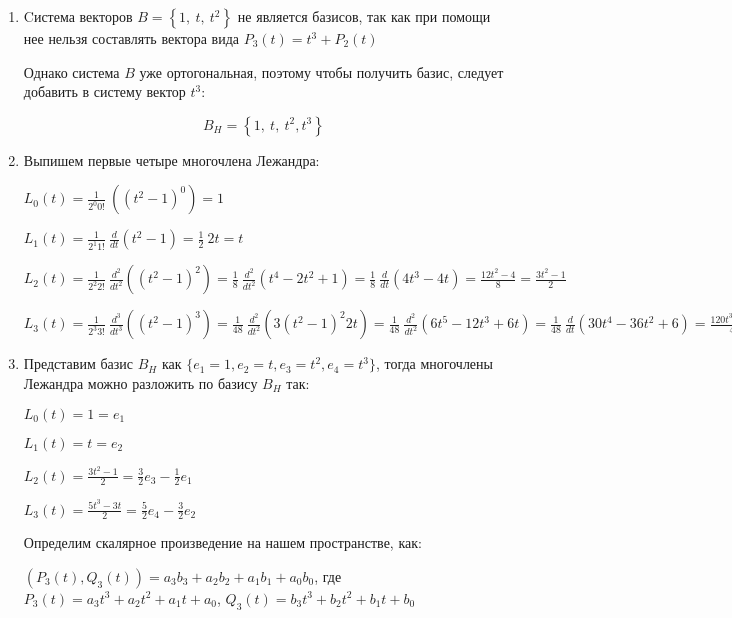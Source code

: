 \begin{enumerate}
    \item Cистема векторов $B=\left\{1,\ t,\ t^2\right\}$ не является базисов, так как при помощи нее нельзя составлять вектора вида $P_3(t) = t^3 + P_2(t)$

    Однако система $B$ уже ортогональная, поэтому чтобы получить базис, следует добавить в систему вектор $t^3$:

    \[B_H = \left\{1,\ t,\ t^2, t^3\right\}\]

    \item Выпишем первые четыре многочлена Лежандра:

    $\displaystyle L_0\left(t\right)=\frac{1}{2^0 0!}\ \left(\left(t^2-1\right)^0\right) = 1$

    $\displaystyle L_1\left(t\right)=\frac{1}{2^1 1!}\ \frac{d}{dt}\left(t^2-1\right) = \frac{1}{2}\ 2t = t$

    $\displaystyle L_2\left(t\right)=\frac{1}{2^2 2!}\ \frac{d^2}{dt^2}\left(\left(t^2-1\right)^2\right) =
    \frac{1}{8}\ \frac{d^2}{dt^2}\left(t^4 - 2t^2 + 1\right) = \frac{1}{8}\ \frac{d}{dt}\left(4t^3 - 4t\right) = \frac{12t^2 - 4}{8} = \frac{3t^2 - 1}{2}$

    $\displaystyle L_3\left(t\right)=\frac{1}{2^3 3!}\ \frac{d^3}{dt^3}\left(\left(t^2-1\right)^3\right) =
    \frac{1}{48}\ \frac{d^2}{dt^2}\left(3 \left(t^2-1\right)^2 2t\right) = \frac{1}{48}\ \frac{d^2}{dt^2}\left(6t^5 - 12t^3 + 6t\right) =
    \frac{1}{48}\ \frac{d}{dt}\left(30t^4 - 36t^2 + 6\right) = \frac{120t^3 - 72t}{48} = \frac{5t^3 - 3t}{2}$

    \item Представим базис $B_H$ как $\{e_1 = 1, e_2 = t, e_3 = t^2, e_4 = t^3\}$, тогда многочлены Лежандра можно разложить по базису $B_H$ так:

    $\displaystyle L_0\left(t\right) = 1 = e_1$

    $\displaystyle L_1\left(t\right) = t = e_2$

    $\displaystyle L_2\left(t\right) = \frac{3t^2 - 1}{2} = \frac{3}{2} e_3 - \frac{1}{2} e_1$

    $\displaystyle L_3\left(t\right) = \frac{5t^3 - 3t}{2} = \frac{5}{2} e_4 - \frac{3}{2} e_2$

    Определим скалярное произведение на нашем пространстве, как:

    $(P_3(t), Q_3(t)) = a_3 b_3 + a_2 b_2 + a_1 b_1 + a_0 b_0$, где $P_3(t) = a_3 t^3 + a_2 t^2 + a_1 t + a_0$, $Q_3(t) = b_3 t^3 + b_2 t^2 + b_1 t + b_0$


\end{enumerate}

